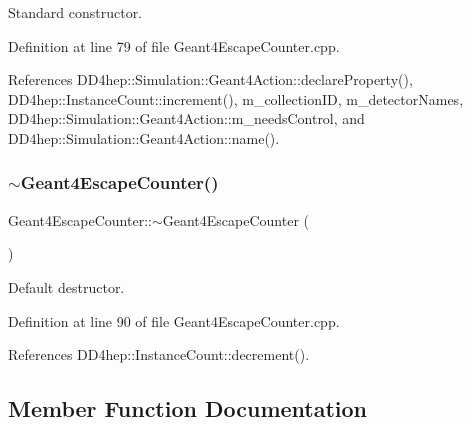 Standard constructor. 



Definition at line 79 of file Geant4\+Escape\+Counter.\+cpp.



References D\+D4hep\+::\+Simulation\+::\+Geant4\+Action\+::declare\+Property(), D\+D4hep\+::\+Instance\+Count\+::increment(), m\+\_\+collection\+ID, m\+\_\+detector\+Names, D\+D4hep\+::\+Simulation\+::\+Geant4\+Action\+::m\+\_\+needs\+Control, and D\+D4hep\+::\+Simulation\+::\+Geant4\+Action\+::name().

\hypertarget{class_d_d4hep_1_1_simulation_1_1_geant4_escape_counter_a5bfa77ab4c12efbfc6e311dcf0cc2d6f}{}\label{class_d_d4hep_1_1_simulation_1_1_geant4_escape_counter_a5bfa77ab4c12efbfc6e311dcf0cc2d6f} 
\subsubsection{\texorpdfstring{$\sim$\+Geant4\+Escape\+Counter()}{~Geant4EscapeCounter()}}
{\footnotesize\ttfamily Geant4\+Escape\+Counter\+::$\sim$\+Geant4\+Escape\+Counter (\begin{DoxyParamCaption}{ }\end{DoxyParamCaption})\hspace{0.3cm}{\ttfamily [virtual]}}



Default destructor. 



Definition at line 90 of file Geant4\+Escape\+Counter.\+cpp.



References D\+D4hep\+::\+Instance\+Count\+::decrement().



\subsection{Member Function Documentation}
\hypertarget{class_d_d4hep_1_1_simulation_1_1_geant4_escape_counter_a869bbe150025b9798af6ab7487d225de}{}\label{class_d_d4hep_1_1_simulation_1_1_geant4_escape_counter_a869bbe150025b9798af6ab7487d225de} 
